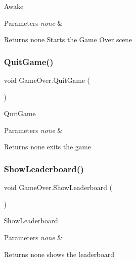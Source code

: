 Awake 
\begin{DoxyParams}{Parameters}
{\em none} & \\
\hline
\end{DoxyParams}
\begin{DoxyReturn}{Returns}
none Starts the Game Over scene 
\end{DoxyReturn}
\mbox{\label{class_game_over_a252e97e89fa007889c2a9fb4a2f9b06c}} 
\subsubsection{\texorpdfstring{Quit\+Game()}{QuitGame()}}
{\footnotesize\ttfamily void Game\+Over.\+Quit\+Game (\begin{DoxyParamCaption}{ }\end{DoxyParamCaption})\hspace{0.3cm}{\ttfamily [inline]}}

Quit\+Game 
\begin{DoxyParams}{Parameters}
{\em none} & \\
\hline
\end{DoxyParams}
\begin{DoxyReturn}{Returns}
none exits the game 
\end{DoxyReturn}
\mbox{\label{class_game_over_a01c0b3e1f8612df9ebd5675ba0719beb}} 
\subsubsection{\texorpdfstring{Show\+Leaderboard()}{ShowLeaderboard()}}
{\footnotesize\ttfamily void Game\+Over.\+Show\+Leaderboard (\begin{DoxyParamCaption}{ }\end{DoxyParamCaption})\hspace{0.3cm}{\ttfamily [inline]}}

Show\+Leaderboard 
\begin{DoxyParams}{Parameters}
{\em none} & \\
\hline
\end{DoxyParams}
\begin{DoxyReturn}{Returns}
none shows the leaderboard 
\end{DoxyReturn}
\mbox{\label{class_game_over_af7a0b3719580737182a952c8fb487232}} 
